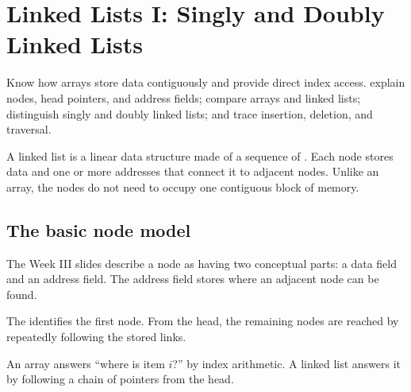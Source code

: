 \chapter{Linked Lists I: Singly and Doubly Linked Lists}\label{ch:linked-lists}

\chapterguide%
  {Know how arrays store data contiguously and provide direct index access.}
  {explain nodes, head pointers, and address fields; compare arrays and linked lists; distinguish singly and doubly linked lists; and trace insertion, deletion, and traversal.}

A linked list is a linear data structure made of a sequence of . Each node stores data and one or more addresses that connect it to adjacent nodes. Unlike an array, the nodes do not need to occupy one contiguous block of memory.

\section{The basic node model}

The Week III slides describe a node as having two conceptual parts: a data field and an address field. The address field stores where an adjacent node can be found.

\begin{mlfigure}
\end{mlfigure}

The  identifies the first node. From the head, the remaining nodes are reached by repeatedly following the stored links.

\begin{keyidea}
An array answers ``where is item $i$?'' by index arithmetic. A linked list answers it by following a chain of pointers from the head.
\end{keyidea}

